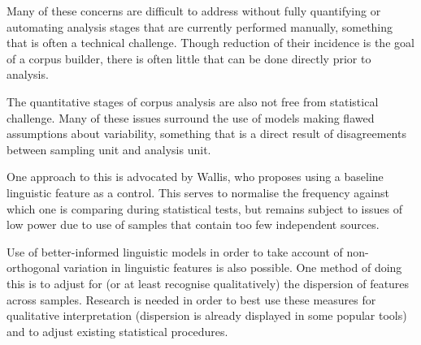 Many of these concerns are difficult to address without fully quantifying or automating analysis stages that are currently performed manually, something that is often a technical challenge.  Though reduction of their incidence is the goal of a corpus builder, there is often little that can be done directly prior to analysis.

The quantitative stages of corpus analysis are also not free from statistical challenge.  Many of these issues surround the use of models making flawed assumptions about variability\cite{kilgarriff2005language}, something that is a direct result of disagreements between sampling unit and analysis unit.

One approach to this is advocated by Wallis\cite{wallis2013vexed}, who proposes using a baseline linguistic feature as a control.  This serves to normalise the frequency against which one is comparing during statistical tests, but remains subject to issues of low power due to use of samples that contain too few independent sources.

Use of better-informed linguistic models in order to take account of non-orthogonal variation in linguistic features is also possible.  One method of doing this is to adjust for (or at least recognise qualitatively) the dispersion of features across samples\cite{gries2008dispersions,gries2010dispersions}.  Research is needed in order to best use these measures for qualitative interpretation (dispersion is already displayed in some popular tools\cite{anthony2011antconc}) and to adjust existing statistical procedures.











